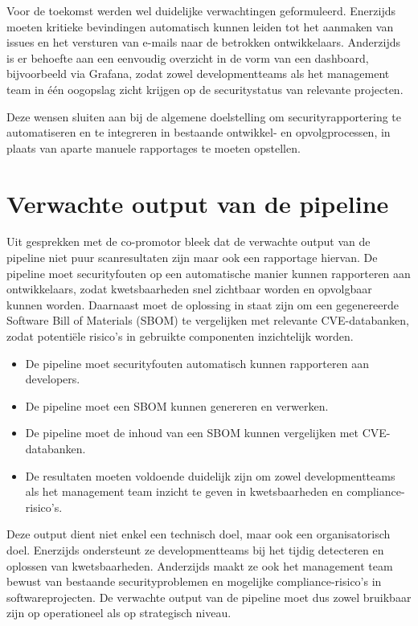 Voor de toekomst werden wel duidelijke verwachtingen geformuleerd. Enerzijds moeten kritieke bevindingen automatisch kunnen leiden tot het aanmaken van issues en het versturen van e-mails naar de betrokken ontwikkelaars. Anderzijds is er behoefte aan een eenvoudig overzicht in de vorm van een dashboard, bijvoorbeeld via Grafana, zodat zowel developmentteams als het management team in één oogopslag zicht krijgen op de securitystatus van relevante projecten.

Deze wensen sluiten aan bij de algemene doelstelling om securityrapportering te automatiseren en te integreren in bestaande ontwikkel- en opvolgprocessen, in plaats van aparte manuele rapportages te moeten opstellen.

\section{Verwachte output van de pipeline}

Uit gesprekken met de co-promotor bleek dat de verwachte output van de pipeline niet puur scanresultaten zijn maar ook een rapportage hiervan. De pipeline moet securityfouten op een automatische manier kunnen rapporteren aan ontwikkelaars, zodat kwetsbaarheden snel zichtbaar worden en opvolgbaar kunnen worden. Daarnaast moet de oplossing in staat zijn om een gegenereerde Software Bill of Materials (SBOM) te vergelijken met relevante CVE-databanken, zodat potentiële risico's in gebruikte componenten inzichtelijk worden.

\begin{itemize}
    \item De pipeline moet securityfouten automatisch kunnen rapporteren aan developers.
    \item De pipeline moet een SBOM kunnen genereren en verwerken.
    \item De pipeline moet de inhoud van een SBOM kunnen vergelijken met CVE-\\databanken.
    \item De resultaten moeten voldoende duidelijk zijn om zowel developmentteams als het management team inzicht te geven in kwetsbaarheden en compliance-risico's.
\end{itemize}

Deze output dient niet enkel een technisch doel, maar ook een organisatorisch doel. Enerzijds ondersteunt ze developmentteams bij het tijdig detecteren en oplossen van kwetsbaarheden. Anderzijds maakt ze ook het management team bewust van bestaande securityproblemen en mogelijke compliance-risico's in softwareprojecten. De verwachte output van de pipeline moet dus zowel bruikbaar zijn op operationeel als op strategisch niveau.

